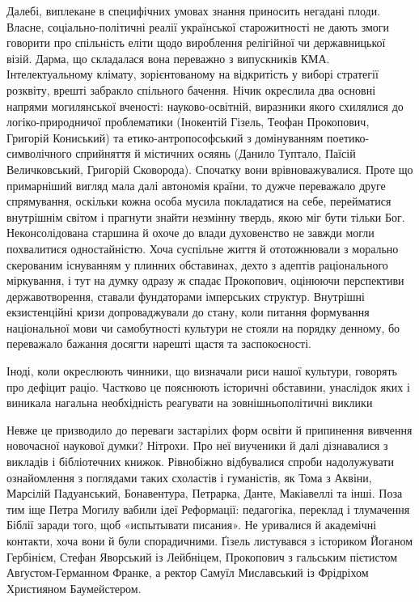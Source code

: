 Далебі, виплекане в специфічних умовах знання приносить негадані плоди. Власне,
соціально-політичні реалії української старожитності не дають змоги говорити
про спільність еліти щодо вироблення релігійної чи державницької візій. Дарма,
що складалася вона переважно з випускників КМА. Інтелектуальному клімату,
зорієнтованому на відкритість у виборі стратегії розквіту, врешті забракло
спільного бачення. Нічик окреслила два основні напрями могилянської вченості:
науково-освітній, виразники якого схилялися до логіко-природничої проблематики
(Інокентій Гізель, Теофан Прокопович, Григорій Кониський) та
етико-антропософський з домінуванням поетико-символічного сприйняття й
містичних осяянь (Данило Туптало, Паїсій Величковський, Григорій Сковорода).
Спочатку вони врівноважувалися. Проте що примарніший вигляд мала далі автономія
країни, то дужче переважало друге спрямування, оскільки кожна особа мусила
покладатися на себе, перейматися внутрішнім світом і прагнути знайти незмінну
твердь, якою міг бути тільки Бог. Неконсолідована старшина й охоче до влади
духовенство не завжди могли похвалитися одностайністю. Хоча суспільне життя й
ототожнювали з морально скерованим існуванням у плинних обставинах, дехто з
адептів раціонального міркування, і тут на думку одразу ж спадає Прокопович,
оцінюючи перспективи державотворення, ставали фундаторами імперських структур.
Внутрішні екзистенційні кризи допроваджували до стану, коли питання формування
національної мови чи самобутності культури не стояли на порядку денному, бо
переважало бажання досягти нарешті щастя та заспокоєності.

\begin{zznagolos}
Іноді, коли окреслюють чинники, що визначали риси нашої культури, говорять про
дефіцит раціо. Частково це пояснюють історичні обставини, унаслідок яких і
виникала нагальна необхідність реагувати на зовнішньополітичні виклики
\end{zznagolos}

Невже це призводило до переваги застарілих форм освіти й припинення вивчення
новочасної наукової думки? Нітрохи. Про неї виученики й далі дізнавалися з
викладів і бібліотечних книжок. Рівнобіжно відбувалися спроби надолужувати
ознайомлення з поглядами таких схоластів і гуманістів, як Тома з Аквіни,
Марсілій Падуанський, Бонавентура, Петрарка, Данте, Макіавеллі та інші. Поза
тим іще Петра Могилу вабили ідеї Реформації: педагогіка, переклад і тлумачення
Біблії заради того, щоб «испытывати писания». Не уривалися й академічні
контакти, хоча вони й були спорадичними. Ґізель листувався з істориком Йоганом
Гербінієм, Стефан Яворський із Лейбніцем, Прокопович з гальським пієтистом
Авґустом-Германном Франке, а ректор Самуїл Миславський із Фрідріхом Християном
Баумейстером. 

